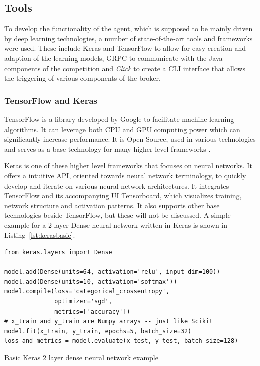 \subsection{Tools}

To develop the functionality of the agent, which is supposed to be mainly driven by deep learning technologies, a number
of state-of-the-art tools and frameworks were  used. These include
Keras and TensorFlow to allow for easy creation and adaption of the learning models,
\ac{GRPC} to communicate with the Java components of the competition and
\emph{Click} to create a \ac{CLI} interface that allows the triggering of various components of the broker.



\subsubsection{TensorFlow and Keras}%
\label{sub:tensorflow_and_keras}

TensorFlow is a library developed by Google to facilitate machine learning algorithms. It can leverage both \ac{CPU}
and \ac{GPU} computing power which can significantly increase performance. It is Open Source, used in various
technologies and serves as a base technology for many higher level frameworks \citep{tensorflow2015-whitepaper}.

Keras is one of these higher level frameworks that focuses on neural networks. It offers a intuitive \ac{API}, oriented towards
neural network terminology, to quickly develop and iterate on various neural network architectures. It integrates TensorFlow and its
accompanying \ac{UI} Tensorboard, which visualizes training, network structure and activation patterns. It also supports
other base technologies beside TensorFlow, but these will not be discussed. A simple example for a 2 layer Dense neural network written in Keras is shown in Listing~\ref{lst:kerasbasic}.


\begin{listing}
    \begin{verbatim}
from keras.layers import Dense

model.add(Dense(units=64, activation='relu', input_dim=100))
model.add(Dense(units=10, activation='softmax'))
model.compile(loss='categorical_crossentropy',
              optimizer='sgd',
              metrics=['accuracy'])
# x_train and y_train are Numpy arrays -- just like Scikit
model.fit(x_train, y_train, epochs=5, batch_size=32)
loss_and_metrics = model.evaluate(x_test, y_test, batch_size=128)
    \end{verbatim}
    \caption{Basic Keras 2 layer dense neural network example}
    \label{lst:kerasbasic}
\end{listing}

